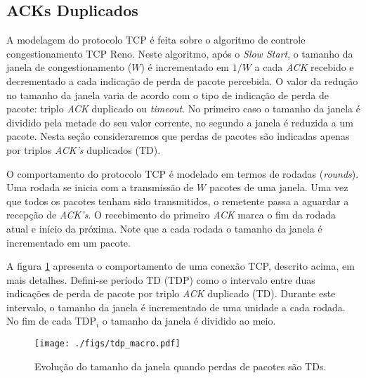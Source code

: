 
\subsection{ACKs Duplicados}
A modelagem do protocolo TCP é feita sobre o algoritmo de controle congestionamento TCP Reno.
Neste algoritmo, após o \textit{Slow Start}, o tamanho da janela de congestionamento ($W$) é 
incrementado em $1/W$ a cada \textit{ACK} recebido e decrementado a cada indicação de perda 
de pacote percebida. O valor da redução no tamanho da janela varia de acordo com o tipo de indicação de
perda de pacote: triplo \textit{ACK} duplicado ou \textit{timeout}. No primeiro caso o tamanho
da janela é dividido pela metade do seu valor corrente, no segundo a janela é reduzida a um 
pacote. Nesta seção consideraremos que perdas de pacotes são indicadas apenas por triplos 
\textit{ACK's} duplicados (TD).

O comportamento do protocolo TCP é modelado em termos de rodadas (\textit{rounds}). Uma rodada
se inicia com a transmissão de $W$ pacotes de uma janela. Uma vez que todos os pacotes tenham sido 
transmitidos, o remetente passa a aguardar a recepção de \textit{ACK's}. O recebimento do primeiro 
\textit{ACK} marca o fim da rodada atual e início da próxima. Note que a cada rodada o tamanho da 
janela é incrementado em um pacote.

A figura \ref{fig:tdp_macro} apresenta o comportamento de uma conexão TCP, descrito acima, em mais detalhes. 
Defini-se período TD (TDP) como o intervalo entre duas indicações de perda de pacote por triplo \textit{ACK} 
duplicado (TD). Durante este intervalo, o tamanho da janela é incrementado de uma unidade a cada rodada. 
No fim de cada TDP$_{i}$ o tamanho da janela é dividido ao meio.

\begin{figure}[ht]
  \centering
  \texttt{[image: ./figs/tdp\_macro.pdf]}
  \caption{Evolução do tamanho da janela quando perdas de pacotes são TDs.}
  \label{fig:tdp_macro}
\end{figure}


